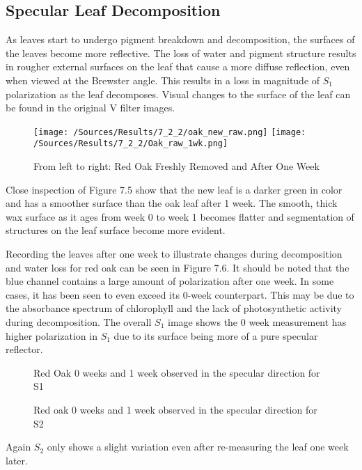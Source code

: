 \subsection{Specular Leaf Decomposition}
As leaves start to undergo pigment breakdown and decomposition, the surfaces of the leaves become more reflective.  The loss of water and pigment structure results in rougher external surfaces on the leaf that cause a more diffuse reflection, even when viewed at the Brewster angle.  This results in a loss in magnitude of $S_1$ polarization as the leaf decomposes.  Visual changes to the surface of the leaf can be found in the original V filter images.
%
\begin{figure}
    \centering
    \hspace*{\fill}%
    \texttt{[image: /Sources/Results/7\_2\_2/oak\_new\_raw.png]}\hfill%
    \texttt{[image: /Sources/Results/7\_2\_2/Oak\_raw\_1wk.png]}
    \hspace*{\fill}%
    \caption{From left to right: Red Oak Freshly Removed and After One Week}
    \label{fig:specular-raw-decompose}
\end{figure}
%
Close inspection of Figure 7.5 show that the new leaf is a darker green in color and has a smoother surface than the oak leaf after 1 week.  The smooth, thick wax surface as it ages from week 0 to week 1 becomes flatter and segmentation of structures on the leaf surface become more evident.

Recording the leaves after one week to illustrate changes during decomposition and water loss for red oak can be seen in Figure 7.6.  It should be noted that the blue channel contains a large amount of polarization after one week. In some cases, it has been seen to even exceed its 0-week counterpart. This may be due to the absorbance spectrum of chlorophyll and the lack of photosynthetic activity during decomposition. The overall $S_1$ image shows the 0 week measurement has higher polarization in $S_1$ due to its surface being more of a pure specular reflector.
%
\begin{sidewaysfigure}
    \begin{center}
    \end{center}
    \caption{Red Oak 0 weeks and 1 week observed in the specular direction for S1}
    \label{fig:polarization}
\end{sidewaysfigure}
%
\begin{sidewaysfigure}
    \begin{center}
    \end{center}
    \caption{Red oak 0 weeks and 1 week observed in the specular direction for S2}
    \label{fig:polarization}
\end{sidewaysfigure}
%
Again $S_2$ only shows a slight variation even after re-measuring the leaf one week later.

